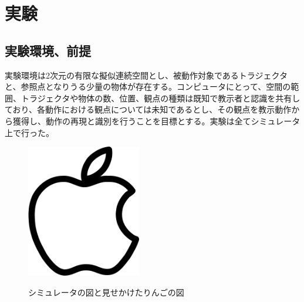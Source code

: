 ﻿%
\chapter{実験}

\section{実験環境、前提}

実験環境は2次元の有限な擬似連続空間とし、被動作対象であるトラジェクタと、参照点となりうる少量の物体が存在する。コンピュータにとって、空間の範囲、トラジェクタや物体の数、位置、観点の種類は既知で教示者と認識を共有しており、各動作における観点については未知であるとし、その観点を教示動作から獲得し、動作の再現と識別を行うことを目標とする。実験は全てシミュレータ上で行った。

	\begin{figure}[h]
		\begin{center}
			\includegraphics[width=5cm]{apple.png} \\ %
			\caption{シミュレータの図と見せかけたりんごの図}
		\end{center}
	\end{figure}

